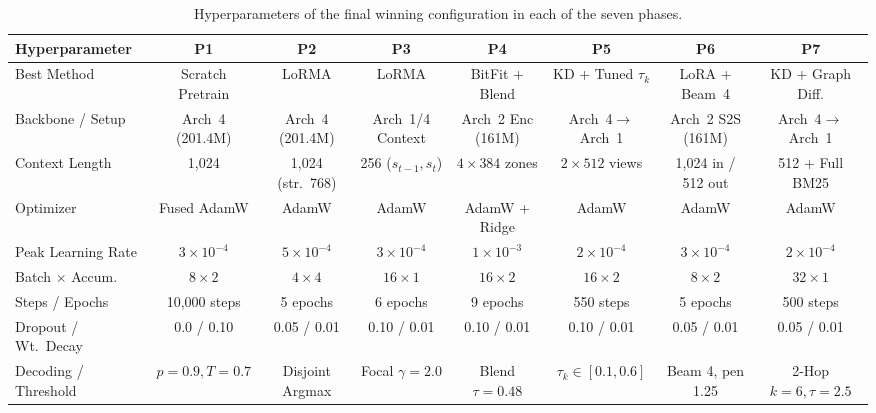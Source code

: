 \documentclass[11pt, oneside]{article}
\begin{document}
\begin{table}[t]
\centering
\scriptsize
\setlength{\tabcolsep}{2.2pt}
\renewcommand{\arraystretch}{0.88}
\caption{Hyperparameters of the final winning configuration in each of the seven phases.}
\label{tab:hparams}
\begin{adjustbox}{width=\textwidth}
\begin{tabular}{@{}lccccccc@{}}
\toprule
\textbf{Hyperparameter} & \textbf{P1} & \textbf{P2} & \textbf{P3} & \textbf{P4} & \textbf{P5} & \textbf{P6} & \textbf{P7} \\
\midrule
Best Method & Scratch Pretrain & LoRMA & LoRMA & BitFit + Blend & KD + Tuned $\tau_k$ & LoRA + Beam~4 & KD + Graph Diff. \\
Backbone / Setup & Arch~4 (201.4M) & Arch~4 (201.4M) & Arch~1/4 Context & Arch~2 Enc (161M) & Arch~4$\to$Arch~1 & Arch~2 S2S (161M) & Arch~4$\to$Arch~1 \\
Context Length & 1,024 & 1,024 (str.\ 768) & 256 ($s_{t-1}, s_t$) & $4 \times 384$ zones & $2 \times 512$ views & 1,024 in / 512 out & 512 + Full BM25 \\
Optimizer & Fused AdamW & AdamW & AdamW & AdamW + Ridge & AdamW & AdamW & AdamW \\
Peak Learning Rate & $3\times 10^{-4}$ & $5\times 10^{-4}$ & $3\times 10^{-4}$ & $1\times 10^{-3}$ & $2\times 10^{-4}$ & $3\times 10^{-4}$ & $2\times 10^{-4}$ \\
Batch $\times$ Accum. & $8 \times 2$ & $4 \times 4$ & $16 \times 1$ & $16 \times 2$ & $16 \times 2$ & $8 \times 2$ & $32 \times 1$ \\
Steps / Epochs & 10,000 steps & 5 epochs & 6 epochs & 9 epochs & 550 steps & 5 epochs & 500 steps \\
Dropout / Wt.\ Decay & 0.0 / 0.10 & 0.05 / 0.01 & 0.10 / 0.01 & 0.10 / 0.01 & 0.10 / 0.01 & 0.05 / 0.01 & 0.05 / 0.01 \\
Decoding / Threshold & $p=0.9, T=0.7$ & Disjoint Argmax & Focal $\gamma=2.0$ & Blend $\tau=0.48$ & $\tau_k \in [0.1, 0.6]$ & Beam 4, pen 1.25 & 2-Hop $k=6, \tau=2.5$ \\
\bottomrule
\end{tabular}
\end{adjustbox}
\end{table}
\end{document}
